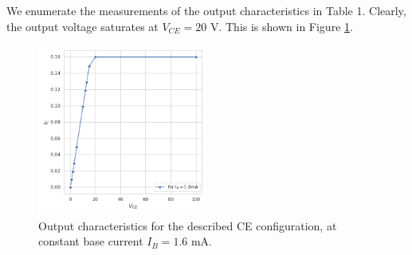 \documentclass{article}
\begin{document}
	We enumerate the measurements of the output characteristics in Table 1. Clearly, the output voltage saturates at $V_{CE} = 20$ V. This is shown in Figure \ref{fig:out}.

	\begin{figure}[!h]
		\centering
		\includegraphics[width=0.5\textwidth]{output_chars}
		\caption{Output characteristics for the described CE configuration, at constant base current $I_B = 1.6$ mA.}
		\label{fig:out}
	\end{figure}
	
\end{document}
